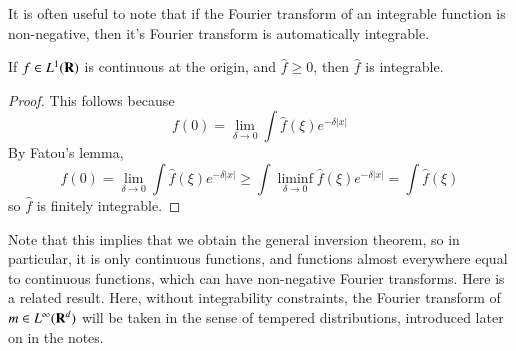 It is often useful to note that if the Fourier transform of an integrable function is non-negative, then it's Fourier transform is automatically integrable.

\begin{theorem}
   If $f \in L^1(\operatorname{\mathbf{R}})$ is continuous at the origin, and $\widehat{f} \geq 0$, then $\widehat{f}$ is integrable.
\end{theorem}
\begin{proof}
   This follows because
   \[ f(0) = \lim_{\delta \to 0} \int \widehat{f}(\xi) e^{-\delta |x|} \]
   By Fatou's lemma,
   \[ f(0) = \lim_{\delta \to 0} \int \widehat{f}(\xi) e^{-\delta |x|} \geq \int \liminf_{\delta \to 0} \widehat{f}(\xi) e^{-\delta |x|} = \int \widehat{f}(\xi) \]
   so $\widehat{f}$ is finitely integrable.
\end{proof}

Note that this implies that we obtain the general inversion theorem, so in particular, it is only continuous functions, and functions almost everywhere equal to continuous functions, which can have non-negative Fourier transforms. Here is a related result. Here, without integrability constraints, the Fourier transform of $m \in L^\infty(\operatorname{\mathbf{R}}^d)$ will be taken in the sense of tempered distributions, introduced later on in the notes.

